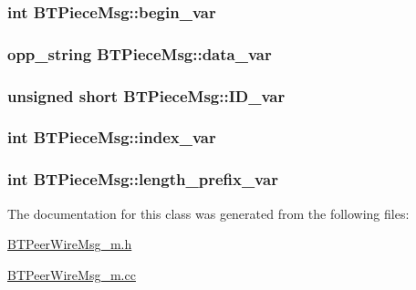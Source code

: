 \subsubsection[{begin\+\_\+var}]{\setlength{\rightskip}{0pt plus 5cm}int B\+T\+Piece\+Msg\+::begin\+\_\+var\hspace{0.3cm}{\ttfamily [protected]}}\label{classBTPieceMsg_a0d1fed26edc84d361d74986fa4593c71}
\hypertarget{classBTPieceMsg_ab0ce35b2c10df0e33900776ce415473d}{}
\subsubsection[{data\+\_\+var}]{\setlength{\rightskip}{0pt plus 5cm}opp\+\_\+string B\+T\+Piece\+Msg\+::data\+\_\+var\hspace{0.3cm}{\ttfamily [protected]}}\label{classBTPieceMsg_ab0ce35b2c10df0e33900776ce415473d}
\hypertarget{classBTPieceMsg_aa46d6993c9d02a3b4add2a69b811de48}{}
\subsubsection[{I\+D\+\_\+var}]{\setlength{\rightskip}{0pt plus 5cm}unsigned short B\+T\+Piece\+Msg\+::\+I\+D\+\_\+var\hspace{0.3cm}{\ttfamily [protected]}}\label{classBTPieceMsg_aa46d6993c9d02a3b4add2a69b811de48}
\hypertarget{classBTPieceMsg_a5caacefaece64a71bc6b5e209e4d13a0}{}
\subsubsection[{index\+\_\+var}]{\setlength{\rightskip}{0pt plus 5cm}int B\+T\+Piece\+Msg\+::index\+\_\+var\hspace{0.3cm}{\ttfamily [protected]}}\label{classBTPieceMsg_a5caacefaece64a71bc6b5e209e4d13a0}
\hypertarget{classBTPieceMsg_a003b938dabb53ea470ef14fee77ce17c}{}
\subsubsection[{length\+\_\+prefix\+\_\+var}]{\setlength{\rightskip}{0pt plus 5cm}int B\+T\+Piece\+Msg\+::length\+\_\+prefix\+\_\+var\hspace{0.3cm}{\ttfamily [protected]}}\label{classBTPieceMsg_a003b938dabb53ea470ef14fee77ce17c}


The documentation for this class was generated from the following files\+:\begin{DoxyCompactItemize}
\item 
\hyperlink{BTPeerWireMsg__m_8h}{B\+T\+Peer\+Wire\+Msg\+\_\+m.\+h}\item 
\hyperlink{BTPeerWireMsg__m_8cc}{B\+T\+Peer\+Wire\+Msg\+\_\+m.\+cc}\end{DoxyCompactItemize}
